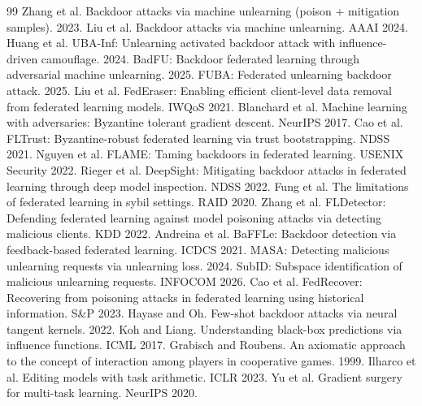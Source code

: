 \documentclass[10pt,a4paper]{article}
\begin{document}
\begin{thebibliography}{99}\small
{} Zhang et al. Backdoor attacks via machine unlearning (poison + mitigation samples). 2023.
 Liu et al. Backdoor attacks via machine unlearning. AAAI 2024.
 Huang et al. UBA-Inf: Unlearning activated backdoor attack with influence-driven camouflage. 2024.
 BadFU: Backdoor federated learning through adversarial machine unlearning. 2025.
 FUBA: Federated unlearning backdoor attack. 2025.
 Liu et al. FedEraser: Enabling efficient client-level data removal from federated learning models. IWQoS 2021.
 Blanchard et al. Machine learning with adversaries: Byzantine tolerant gradient descent. NeurIPS 2017.
 Cao et al. FLTrust: Byzantine-robust federated learning via trust bootstrapping. NDSS 2021.
 Nguyen et al. FLAME: Taming backdoors in federated learning. USENIX Security 2022.
 Rieger et al. DeepSight: Mitigating backdoor attacks in federated learning through deep model inspection. NDSS 2022.
 Fung et al. The limitations of federated learning in sybil settings. RAID 2020.
 Zhang et al. FLDetector: Defending federated learning against model poisoning attacks via detecting malicious clients. KDD 2022.
 Andreina et al. BaFFLe: Backdoor detection via feedback-based federated learning. ICDCS 2021.
 MASA: Detecting malicious unlearning requests via unlearning loss. 2024.
 SubID: Subspace identification of malicious unlearning requests. INFOCOM 2026.
 Cao et al. FedRecover: Recovering from poisoning attacks in federated learning using historical information. S\&P 2023.
 Hayase and Oh. Few-shot backdoor attacks via neural tangent kernels. 2022.
 Koh and Liang. Understanding black-box predictions via influence functions. ICML 2017.
 Grabisch and Roubens. An axiomatic approach to the concept of interaction among players in cooperative games. 1999.
 Ilharco et al. Editing models with task arithmetic. ICLR 2023.
 Yu et al. Gradient surgery for multi-task learning. NeurIPS 2020.
\end{thebibliography}
\end{document}
